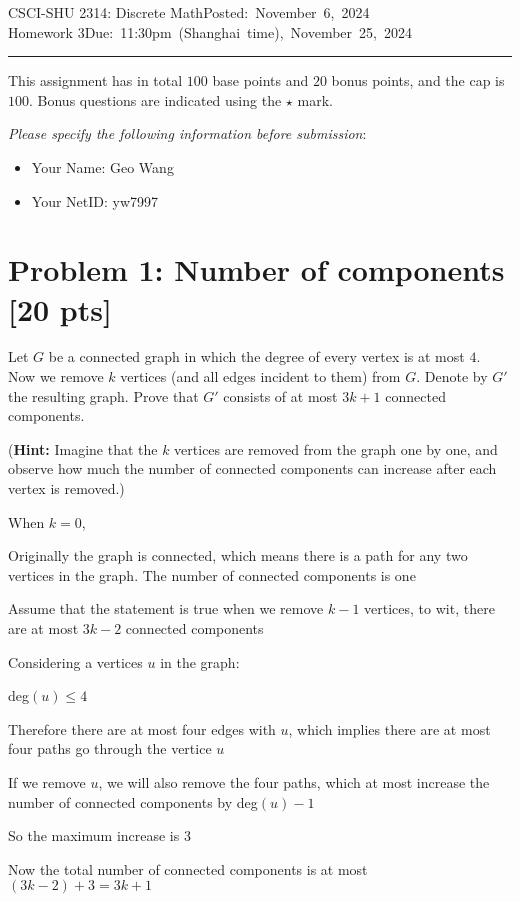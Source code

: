 \documentclass[11pt,twoside]{article}
\newcommand{\homework}[1]{
   \pagestyle{myheadings}
   \thispagestyle{plain}
   \newpage
   \setcounter{page}{1}
   \noindent
   \classname \hfill \mbox{\updatedday} \\
   \instname \hfill \mbox{\duedate}
   \rule{6.5in}{0.5mm}
   \vspace*{-0.1 in}
}
\newcommand{\problem}[1]{\section*{Problem #1}}
\def\classname{CSCI-SHU 2314: Discrete Math}
\def\updatedday{Posted: November 6, 2024}
\def\duedate{Due: 11:30pm (Shanghai time), November 25, 2024}
\def\instname{Homework 3}
\begin{document}
\homework{1}

This assignment has in total $100$ base points and $20$ bonus points, and the cap is $100$.
Bonus questions are indicated using the $\star$ mark.

\textit{Please specify the following information before submission}:
\begin{itemize}
    \item Your Name: Geo Wang%
    \item Your NetID: yw7997%
\end{itemize}




\problem{1: Number of components [20 pts]} 

Let $G$ be a connected graph in which the degree of every vertex is at most $4$.
Now we remove $k$ vertices (and all edges incident to them) from $G$.
Denote by $G'$ the resulting graph.
Prove that $G'$ consists of at most $3k+1$ connected components.

(\textbf{Hint:} Imagine that the $k$ vertices are removed from the graph one by one, and observe how much the number of connected components can increase after each vertex is removed.)

\hspace*{\fill}

When $k = 0$, 

Originally the graph is connected, which means there is a path for any two vertices in the graph. The number of connected components is one

Assume that the statement is true when we remove $k-1$ vertices, to wit, there are at most $3k-2$ connected components

Considering a vertices $u$ in the graph:

deg$(u) \leq 4$

Therefore there are at most four edges with $u$, which implies there are at most four paths go through the vertice $u$

If we remove $u$, we will also remove the four paths, which at most increase the number of connected components by deg$(u) - 1$

So the maximum increase is 3

Now the total number of connected components is at most $(3k-2)+3 = 3k+1$
\end{document}
